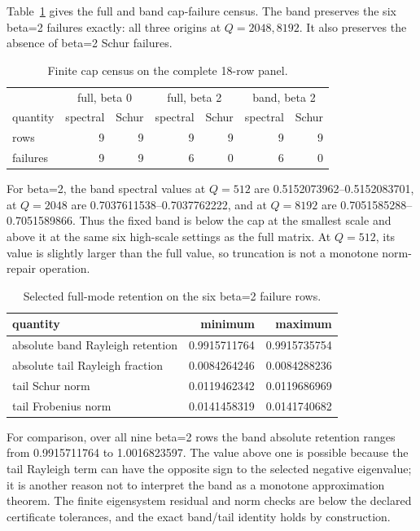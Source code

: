 \documentclass[10pt]{article}
\begin{document}
Table~\ref{tab:census} gives the full and band cap-failure census.  The band
preserves the six beta=2 failures exactly: all three origins at
\(Q=2048,8192\).  It also preserves the absence of beta=2 Schur failures.

\begin{table}[h]
\centering
\caption{Finite cap census on the complete 18-row panel.}
\label{tab:census}
\begin{tabular}{@{}lrrrrrr@{}}
\toprule
 & \multicolumn{2}{c}{full, beta 0} & \multicolumn{2}{c}{full, beta 2}
 & \multicolumn{2}{c}{band, beta 2}\\
quantity & spectral & Schur & spectral & Schur & spectral & Schur\\
\midrule
rows & 9 & 9 & 9 & 9 & 9 & 9\\
failures & 9 & 9 & 6 & 0 & 6 & 0\\
\bottomrule
\end{tabular}
\end{table}

For beta=2, the band spectral values at \(Q=512\) are
0.5152073962--0.5152083701, at \(Q=2048\) are
0.7037611538--0.7037762222, and at \(Q=8192\) are
0.7051585288--0.7051589866.  Thus the fixed band is below the cap at the
smallest scale and above it at the same six high-scale settings as the full
matrix.  At \(Q=512\), its value is slightly larger than the full value,
so truncation is not a monotone norm-repair operation.

\begin{table}[h]
\centering
\caption{Selected full-mode retention on the six beta=2 failure rows.}
\label{tab:retention}
\begin{tabular}{@{}lrr@{}}
\toprule
quantity & minimum & maximum\\
\midrule
absolute band Rayleigh retention & 0.9915711764 & 0.9915735754\\
absolute tail Rayleigh fraction & 0.0084264246 & 0.0084288236\\
tail Schur norm & 0.0119462342 & 0.0119686969\\
tail Frobenius norm & 0.0141458319 & 0.0141740682\\
\bottomrule
\end{tabular}
\end{table}

For comparison, over all nine beta=2 rows the band absolute retention ranges
from 0.9915711764 to 1.0016823597.  The value above one is possible because
the tail Rayleigh term can have the opposite sign to the selected negative
eigenvalue; it is another reason not to interpret the band as a monotone
approximation theorem.  The finite eigensystem residual and norm checks are
below the declared certificate tolerances, and the exact band/tail identity
holds by construction.
\end{document}
